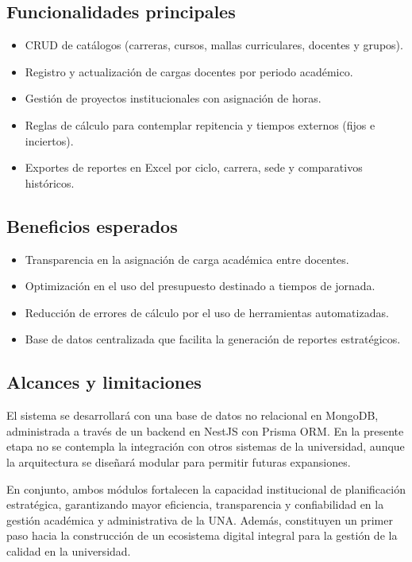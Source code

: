 \subsection*{Funcionalidades principales}
\begin{itemize}
  \item CRUD de catálogos (carreras, cursos, mallas curriculares, docentes y grupos).
  \item Registro y actualización de cargas docentes por periodo académico.
  \item Gestión de proyectos institucionales con asignación de horas.
  \item Reglas de cálculo para contemplar repitencia y tiempos externos (fijos e inciertos).
  \item Exportes de reportes en Excel por ciclo, carrera, sede y comparativos históricos.
\end{itemize}

\subsection*{Beneficios esperados}
\begin{itemize}
  \item Transparencia en la asignación de carga académica entre docentes.
  \item Optimización en el uso del presupuesto destinado a tiempos de jornada.
  \item Reducción de errores de cálculo por el uso de herramientas automatizadas.
  \item Base de datos centralizada que facilita la generación de reportes estratégicos.
\end{itemize}

\subsection*{Alcances y limitaciones}
El sistema se desarrollará con una base de datos no relacional en MongoDB, administrada a través de un backend en NestJS con Prisma ORM. En la presente etapa no se contempla la integración con otros sistemas de la universidad, aunque la arquitectura se diseñará modular para permitir futuras expansiones.

\bigskip

\noindent En conjunto, ambos módulos fortalecen la capacidad institucional de planificación estratégica, garantizando mayor eficiencia, transparencia y confiabilidad en la gestión académica y administrativa de la UNA. Además, constituyen un primer paso hacia la construcción de un ecosistema digital integral para la gestión de la calidad en la universidad.
